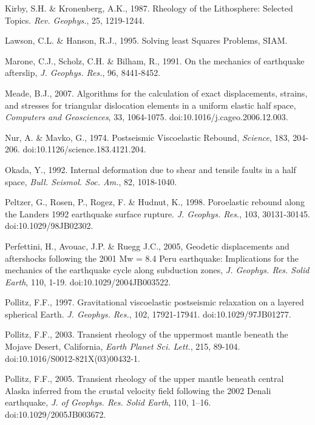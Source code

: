 \documentclass[extra]{gji}
\begin{document}
\begin{thebibliography}{}
 Kirby, S.H. \& Kronenberg,
  A.K., 1987. Rheology of the Lithosphere: Selected Topics. \textit{Rev.
  Geophys.}, 25, 1219-1244.

 Lawson, C.L. \&
  Hanson, R.J., 1995. Solving least Squares Problems, SIAM.

 Marone, C.J., Scholz,
  C.H.  \& Bilham, R., 1991. On the mechanics of earthquake
  afterslip, \textit{J. Geophys. Res.}, 96, 8441-8452.

 Meade, B.J., 2007. Algorithms for the
  calculation of exact displacements, strains, and stresses for
  triangular dislocation elements in a uniform elastic half space,
  \textit{Computers and Geosciences}, 33,
  1064-1075. doi:10.1016/j.cageo.2006.12.003.

 Nur, A. \& Mavko, G.,
  1974. Postseismic Viscoelastic Rebound, \textit{Science}, 183,
  204-206. doi:10.1126/science.183.4121.204.

 Okada, Y., 1992. Internal
  deformation due to shear and tensile faults in a half space,
  \textit{Bull. Seismol. Soc.  Am.}, 82, 1018-1040.

 Peltzer, G., Rosen, P.,
  Rogez, F. \& Hudnut, K., 1998. Poroelastic rebound along the Landers
  1992 earthquake surface rupture. \textit{J. Geophys. Res.}, 103,
  30131-30145. doi:10.1029/98JB02302.

 Perfettini, H., Avouac,
  J.P. \& Ruegg J.C., 2005, Geodetic displacements and aftershocks
  following the 2001 Mw = 8.4 Peru earthquake: Implications for the
  mechanics of the earthquake cycle along subduction zones,
  \textit{J. Geophys.  Res. Solid Earth}, 110,
  1-19. doi:10.1029/2004JB003522.

 Pollitz, F.F.,
  1997. Gravitational viscoelastic postseismic relaxation on a layered
  spherical Earth. \textit{J. Geophys. Res.}, 102,
  17921-17941. doi:10.1029/97JB01277.

 Pollitz, F.F., 2003. Transient
  rheology of the uppermost mantle beneath the Mojave Desert,
  California, \textit{Earth Planet Sci. Lett.}, 215,
  89-104. doi:10.1016/S0012-821X(03)00432-1.

Pollitz, F.F., 2005. Transient
  rheology of the upper mantle beneath central Alaska inferred from
  the crustal velocity field following the 2002 Denali earthquake,
  \textit{J. of Geophys. Res. Solid Earth}, 110,
  1–16. doi:10.1029/2005JB003672.


\end{thebibliography}
\end{document}
